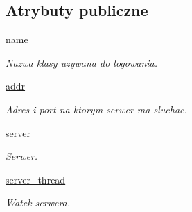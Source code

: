 \subsection*{Atrybuty publiczne}
\begin{DoxyCompactItemize}
\item 
\hypertarget{class_serv_1_1_u_d_p_server_1_1_u_d_p_server_a092c452f84b153880539e7f9968fd4a1}{
\hyperlink{class_serv_1_1_u_d_p_server_1_1_u_d_p_server_a092c452f84b153880539e7f9968fd4a1}{name}}
\label{class_serv_1_1_u_d_p_server_1_1_u_d_p_server_a092c452f84b153880539e7f9968fd4a1}

\begin{DoxyCompactList}\small\item\em Nazwa klasy uzywana do logowania. \item\end{DoxyCompactList}\item 
\hyperlink{class_serv_1_1_u_d_p_server_1_1_u_d_p_server_a19f6bc70abc4eb1d1c0806a9364d1fbe}{addr}
\begin{DoxyCompactList}\small\item\em Adres i port na ktorym serwer ma sluchac. \item\end{DoxyCompactList}\item 
\hypertarget{class_serv_1_1_u_d_p_server_1_1_u_d_p_server_a61a94c838a7067f18e9e1ac122aa2397}{
\hyperlink{class_serv_1_1_u_d_p_server_1_1_u_d_p_server_a61a94c838a7067f18e9e1ac122aa2397}{server}}
\label{class_serv_1_1_u_d_p_server_1_1_u_d_p_server_a61a94c838a7067f18e9e1ac122aa2397}

\begin{DoxyCompactList}\small\item\em Serwer. \item\end{DoxyCompactList}\item 
\hypertarget{class_serv_1_1_u_d_p_server_1_1_u_d_p_server_af86ce8e66ef2b3dfd537260e2a0e6fc9}{
\hyperlink{class_serv_1_1_u_d_p_server_1_1_u_d_p_server_af86ce8e66ef2b3dfd537260e2a0e6fc9}{server\_\-thread}}
\label{class_serv_1_1_u_d_p_server_1_1_u_d_p_server_af86ce8e66ef2b3dfd537260e2a0e6fc9}

\begin{DoxyCompactList}\small\item\em Watek serwera. \item\end{DoxyCompactList}\end{DoxyCompactItemize}



